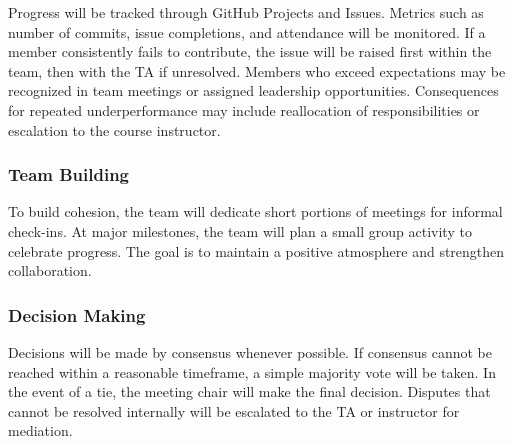 \documentclass{article}
\begin{document}
Progress will be tracked through GitHub Projects and Issues. Metrics such as number of commits, 
issue completions, and attendance will be monitored. If a member consistently fails to contribute, 
the issue will be raised first within the team, then with the TA if unresolved. Members who 
exceed expectations may be recognized in team meetings or assigned leadership opportunities. 
Consequences for repeated underperformance may include reallocation of responsibilities 
or escalation to the course instructor.

\subsubsection*{Team Building}

To build cohesion, the team will dedicate short portions of meetings for informal check-ins. 
At major milestones, the team will plan a small group activity to celebrate progress. 
The goal is to maintain a positive atmosphere and strengthen collaboration.

\subsubsection*{Decision Making} 

Decisions will be made by consensus whenever possible. If consensus cannot be reached within 
a reasonable timeframe, a simple majority vote will be taken. In the event of a tie, the meeting chair 
will make the final decision. Disputes that cannot be resolved internally will be escalated to the TA 
or instructor for mediation.
\end{document}
